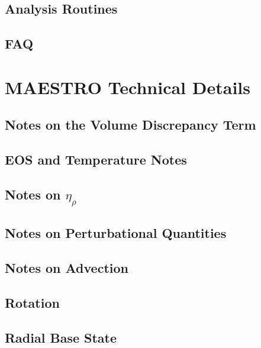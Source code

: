 \documentclass[11pt]{book}
\newcommand{\etarho}{\eta_{\rho}}
\begin{document}
\chapter{Analysis Routines}


\chapter{FAQ}


\part{MAESTRO Technical Details}

\chapter{Notes on the Volume Discrepancy Term}


\chapter{EOS and Temperature Notes}


\chapter{Notes on $\etarho$}


\chapter{Notes on Perturbational Quantities}


\chapter{Notes on Advection}


\chapter{Rotation}


\chapter{Radial Base State}

\end{document}

